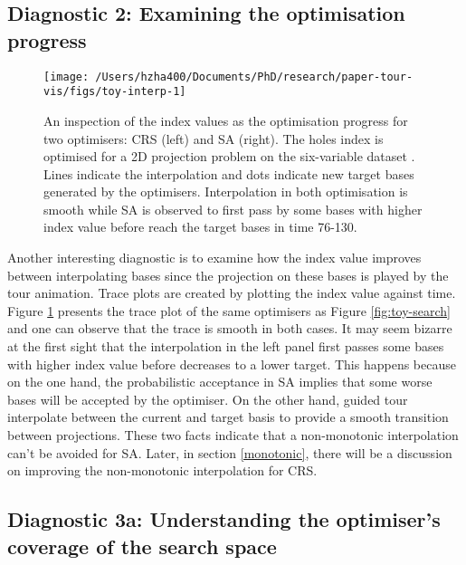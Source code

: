 \hypertarget{toy-interp}{%
\subsection{Diagnostic 2: Examining the optimisation
progress}\label{toy-interp}}

\begin{Schunk}
\begin{figure}

{\centering \texttt{[image: /Users/hzha400/Documents/PhD/research/paper-tour-vis/figs/toy-interp-1]} 

}

\caption[An inspection of the index values as the optimisation progress for two optimisers]{An inspection of the index values as the optimisation progress for two optimisers: CRS (left) and SA (right). The holes index is optimised for a 2D projection problem on the six-variable dataset . Lines indicate the interpolation and dots indicate new target bases generated by the optimisers. Interpolation in both optimisation is smooth while SA is observed to first pass by some bases with higher index value before reach the target bases in time 76-130.}\label{fig:toy-interp}
\end{figure}
\end{Schunk}

Another interesting diagnostic is to examine how the index value
improves between interpolating bases since the projection on these bases
is played by the tour animation. Trace plots are created by plotting the
index value against time. Figure \ref{fig:toy-interp} presents the trace
plot of the same optimisers as Figure \ref{fig:toy-search} and one can
observe that the trace is smooth in both cases. It may seem bizarre at
the first sight that the interpolation in the left panel first passes
some bases with higher index value before decreases to a lower target.
This happens because on the one hand, the probabilistic acceptance in SA
implies that some worse bases will be accepted by the optimiser. On the
other hand, guided tour interpolate between the current and target basis
to provide a smooth transition between projections. These two facts
indicate that a non-monotonic interpolation can't be avoided for SA.
Later, in section \ref{monotonic}, there will be a discussion on
improving the non-monotonic interpolation for CRS.

\hypertarget{toy-pca}{%
\subsection{Diagnostic 3a: Understanding the optimiser's coverage of the
search space}\label{toy-pca}}

